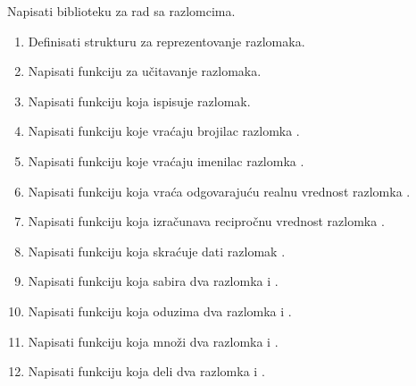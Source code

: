 \begin{Exercise}[label=003]

\end{Exercise}
\begin{Answer}[ref=003]
\end{Answer}

\begin{Exercise}[label=004] %
Napisati biblioteku za rad sa razlomcima.

  \begin{enumerate}

  \item Definisati strukturu  za reprezentovanje razlomaka.
  \item Napisati funkciju  za učitavanje razlomaka.
  \item Napisati funkciju  koja ispisuje razlomak.
  \item Napisati funkciju  koje vraćaju brojilac razlomka .
   \item Napisati funkciju  koje vraćaju imenilac razlomka .
  \item Napisati funkciju  koja vraća odgovarajuću realnu vrednost razlomka .
  \item Napisati funkciju   koja izračunava recipročnu vrednost
    razlomka .
  \item Napisati funkciju  koja skraćuje dati razlomak .
  \item Napisati funkciju  koja sabira dva razlomka  i .
 \item Napisati funkciju  koja oduzima dva razlomka  i .
 \item Napisati funkciju  koja množi
    dva razlomka  i .
 \item Napisati funkciju  koja deli
    dva razlomka  i .
\end{enumerate}


\end{Exercise}
